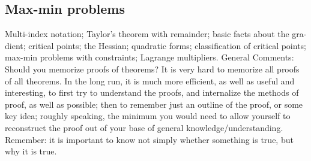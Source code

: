 \subsection{Max-min problems}
Multi-index notation; Taylor’s theorem with remainder; basic facts about the gra-
dient; critical points; the Hessian; quadratic forms; classification of critical points;
max-min problems with constraints; Lagrange multipliers.
General Comments: Should you memorize proofs of theorems? It is very hard to
memorize all proofs of all theorems. In the long run, it is much more efficient, as well
as useful and interesting, to first try to understand the proofs, and internalize the
methods of proof, as well as possible; then to remember just an outline of the proof,
or some key idea; roughly speaking, the minimum you would need to allow yourself
to reconstruct the proof out of your base of general knowledge/understanding.
Remember: it is important to know not simply whether something is true, but why
it is true.
